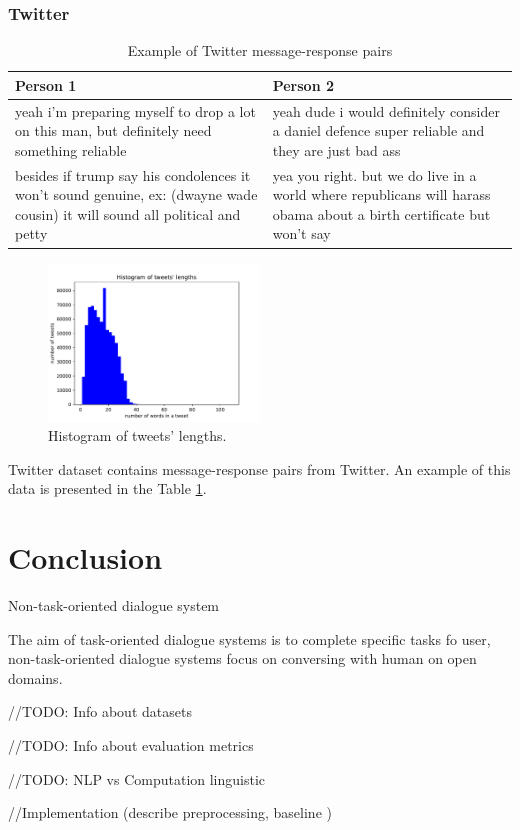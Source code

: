 \subsection{Twitter}
\begin{table}[ht]
\centering
 \begin{tabular}{|p{7cm}|p{7cm}|} 
 \hline\hline
 \textbf{Person 1} & \textbf{Person 2} \\
 \hline\hline
 yeah i'm preparing myself to drop a lot on this man, but definitely need something reliable & yeah dude i would definitely consider a daniel defence super reliable and they are just bad ass \\ 
 \hline
 besides if trump say his condolences it won't sound genuine, ex: (dwayne wade cousin) it will sound all political and petty & yea you right. but we do live in a world where republicans will harass obama about a birth certificate but won't say \\
 \hline\hline
 \end{tabular}
 \caption{Example of Twitter message-response pairs}
\label{tab:twitter_chat}
\end{table}


\begin{figure}[hbt]
  \centering
  \includegraphics[width=0.5\textwidth]{figures/tweet.pdf}
  \caption{Histogram of tweets' lengths.}
  \label{tweet}
\end{figure}

Twitter dataset contains message-response pairs from Twitter. An example of this data is presented in the Table \ref{tab:twitter_chat}. 



\chapter{Conclusion}

Non-task-oriented dialogue system

The aim of task-oriented dialogue systems is to complete specific tasks fo user, non-task-oriented dialogue systems focus on conversing with human on open domains. 

//TODO: Info about datasets

//TODO: Info about evaluation metrics

//TODO: NLP vs Computation linguistic

//Implementation (describe preprocessing, baseline )
